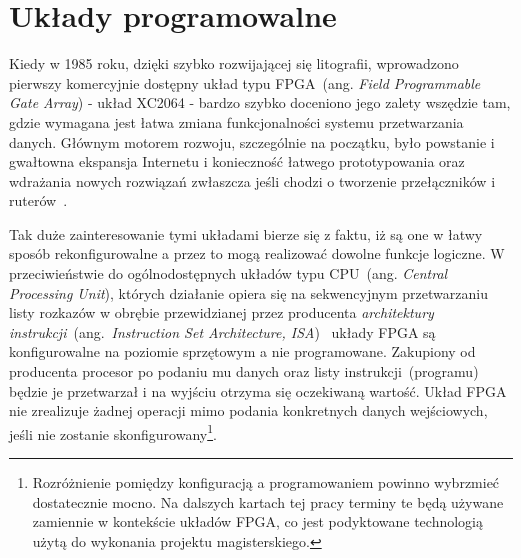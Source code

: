 \chapter{Układy programowalne}
Kiedy w 1985 roku, dzięki szybko rozwijającej się litografii, wprowadzono pierwszy komercyjnie dostępny układ typu FPGA~(ang. \textit{Field Programmable Gate Array}) - układ XC2064 - bardzo szybko doceniono jego zalety wszędzie tam, gdzie wymagana jest łatwa zmiana funkcjonalności systemu przetwarzania danych. Głównym motorem rozwoju, szczególnie na początku, było powstanie i gwałtowna ekspansja Internetu i konieczność łatwego prototypowania oraz wdrażania nowych rozwiązań zwłaszcza jeśli chodzi o tworzenie przełączników i ruterów~\cite{Designing_with_Xilinx}.

Tak duże zainteresowanie tymi układami bierze się z faktu, iż są one w łatwy sposób rekonfigurowalne a przez to mogą realizować dowolne funkcje logiczne. W przeciwieństwie do ogólnodostępnych układów typu CPU~(ang. \textit{Central Processing Unit}), których działanie opiera się na sekwencyjnym przetwarzaniu listy rozkazów w obrębie przewidzianej przez producenta \textit{architektury instrukcji}~(ang.~\textit{Instruction Set Architecture, ISA})~\cite{INTEL_ISA} układy FPGA są konfigurowalne na poziomie sprzętowym a nie programowane. Zakupiony od producenta procesor po podaniu mu danych oraz listy instrukcji~(programu) będzie je przetwarzał i na wyjściu otrzyma się oczekiwaną wartość. Układ FPGA nie zrealizuje żadnej operacji mimo podania konkretnych danych wejściowych, jeśli nie zostanie skonfigurowany\footnote{Rozróżnienie pomiędzy konfiguracją a programowaniem powinno wybrzmieć dostatecznie mocno. Na dalszych kartach tej pracy terminy te będą używane zamiennie w kontekście układów FPGA, co jest podyktowane technologią użytą do wykonania projektu magisterskiego.}.

